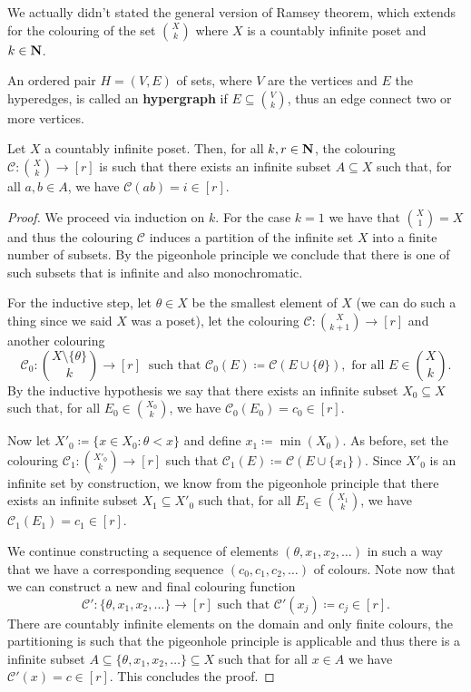 We actually didn't stated the general version of Ramsey theorem, which extends
for the colouring of the set \(\binom{X}{k}\) where \(X\) is a countably infinite
poset and \(k \in \mathbf{N}\).

\begin{definition}[Hypergraph]
An ordered pair \(H = (V, E)\) of sets, where \(V\) are the vertices and
\(E\) the hyperedges, is called an \textbf{hypergraph} if \(E \subseteq
\binom{V}{k}\), thus an edge connect two or more vertices.
\end{definition}

\begin{theorem}
Let \(X\) a countably infinite poset. Then, for all \(k, r \in \mathbf{N}\), the
colouring \(\mathcal{C} : \binom{X}{k} \to [r]\) is such that there exists an
infinite subset \(A \subseteq X\) such that, for all \(a, b \in A\), we
have \(\mathcal{C}(a b) = i \in [r]\).
\end{theorem}

\begin{proof}
We proceed via induction on \(k\). For the case \(k = 1\) we have that
\(\binom{X}{1} = X\) and thus the colouring \(\mathcal{C}\) induces a
partition of the infinite set \(X\) into a finite number of subsets. By the
pigeonhole principle we conclude that there is one of such subsets that is
infinite and also monochromatic.

For the inductive step, let \(\theta \in X\) be the smallest element of \(X\)
(we can do such a thing since we said \(X\) was a poset), let the colouring
\(\mathcal{C} : \binom{X}{k + 1} \to [r]\) and another colouring
\[
    \mathcal{C}_0 : \binom{X \setminus \{\theta\} }{k} \longrightarrow [r]
    \ \text{ such that }
    \mathcal{C}_0(E) \coloneq \mathcal{C}(E \cup \{\theta\} ), \text{ for all }
    E \in \binom{X}{k}.
\]
By the inductive hypothesis we say that there exists an infinite subset \(X_0
\subseteq X\) such that, for all \(E_0 \in \binom{X_0}{k}\), we have
\(\mathcal{C}_0(E_0) = c_0 \in [r]\).

Now let \(X'_0 \coloneq \{x \in X_0: \theta < x\}\) and define \(x_1 \coloneq
\min(X_0)\). As before, set the colouring \(\mathcal{C}_1 : \binom{X'_0}{k} \to
[r]\) such that \(\mathcal{C}_1(E) \coloneq \mathcal{C}(E \cup \{x_1\})\).  Since
\(X'_0\) is an infinite set by construction, we know from the pigeonhole
principle that there exists an infinite subset \(X_1 \subseteq X'_0\) such that,
for all \(E_1 \in \binom{X_1}{k}\), we have \(\mathcal{C}_1 (E_1) = c_1 \in
[r]\).

We continue constructing a sequence of elements \((\theta, x_1, x_2, \dots)\)
in such a way that we have a corresponding sequence \((c_0, c_1, c_2, \dots)\)
of colours. Note now that we can construct a new and final colouring function
\[
    \mathcal{C}' : \{\theta, x_1, x_2, \dots\} \to [r] \text{ such that }
    \mathcal{C}'(x_j) \coloneq c_j \in [r].
\]
There are countably infinite elements on the domain and only finite colours, the
partitioning is such that the pigeonhole principle is applicable and thus there
is a infinite subset \(A \subseteq \{\theta, x_1, x_2, \dots\} \subseteq X\)
such that for all \(x \in A\) we have \(\mathcal{C}'(x) = c \in [r]\).  This
concludes the proof.
\end{proof}
